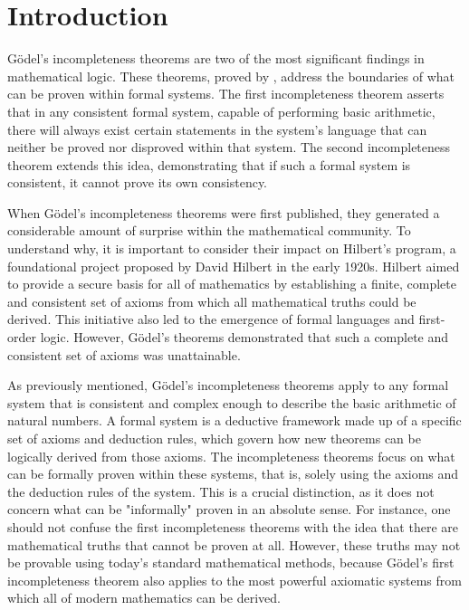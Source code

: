 \chapter*{Introduction}

Gödel’s incompleteness theorems are two of the most significant findings in mathematical logic. 
These theorems, proved by \cite{godel1931formal},
address the boundaries of what can be proven within formal systems. 
The first incompleteness theorem asserts that in any consistent formal system, 
capable of performing basic arithmetic, 
there will always exist certain statements in the system's language that can neither be proved
nor disproved within that system. 
The second incompleteness theorem extends this idea, 
demonstrating that if such a formal system is consistent, it cannot prove its own consistency.

When Gödel's incompleteness theorems were first published, 
they generated a considerable amount of surprise within the mathematical community. 
To understand why, it is important to consider their impact on Hilbert's program, 
a foundational project proposed by David Hilbert in the early 1920s. 
Hilbert aimed to provide a secure basis for all of mathematics by establishing a 
finite, complete and consistent set of axioms from which all mathematical truths could be derived. 
This initiative also led to the emergence of formal languages and first-order logic. 
However, Gödel's theorems demonstrated that such a complete and consistent set of axioms 
was unattainable.

As previously mentioned, Gödel's incompleteness theorems apply to any formal system 
that is consistent and complex enough to describe the basic arithmetic of natural numbers. 
A formal system is a deductive framework made up of a specific set of axioms and deduction rules, 
which govern how new theorems can be logically derived from those axioms.
The incompleteness theorems focus on what can be formally proven within these systems, that is,
solely using the axioms and the deduction rules of the system.
This is a crucial distinction, as it does not concern what can be "informally" proven
in an absolute sense.
For instance, one should not confuse the first incompleteness theorems with the idea that
there are mathematical truths that cannot be proven at all.
However, these truths may not be provable using today's standard mathematical methods, 
because Gödel's first incompleteness theorem also applies to the most powerful axiomatic systems 
from which all of modern mathematics can be derived.

